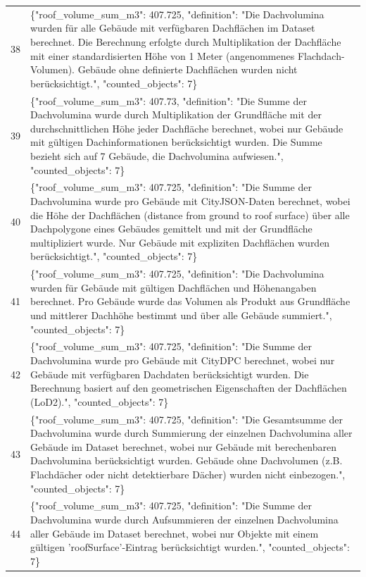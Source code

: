 \documentclass[a4paper,11pt]{article}
\begin{document}
\begin{table}[ht]
\begin{tabular}{r p{12cm}}
38 & \{"roof\_volume\_sum\_m3": 407.725, "definition": "Die Dachvolumina wurden für alle Gebäude mit verfügbaren Dachflächen im Dataset berechnet. Die Berechnung erfolgte durch Multiplikation der Dachfläche mit einer standardisierten Höhe von 1 Meter (angenommenes Flachdach-Volumen). Gebäude ohne definierte Dachflächen wurden nicht berücksichtigt.", "counted\_objects": 7\} \\
39 & \{"roof\_volume\_sum\_m3": 407.73, "definition": "Die Summe der Dachvolumina wurde durch Multiplikation der Grundfläche mit der durchschnittlichen Höhe jeder Dachfläche berechnet, wobei nur Gebäude mit gültigen Dachinformationen berücksichtigt wurden. Die Summe bezieht sich auf 7 Gebäude, die Dachvolumina aufwiesen.", "counted\_objects": 7\} \\
40 & \{"roof\_volume\_sum\_m3": 407.725, "definition": "Die Summe der Dachvolumina wurde pro Gebäude mit CityJSON-Daten berechnet, wobei die Höhe der Dachflächen (distance from ground to roof surface) über alle Dachpolygone eines Gebäudes gemittelt und mit der Grundfläche multipliziert wurde. Nur Gebäude mit expliziten Dachflächen wurden berücksichtigt.", "counted\_objects": 7\} \\
41 & \{"roof\_volume\_sum\_m3": 407.725, "definition": "Die Dachvolumina wurden für Gebäude mit gültigen Dachflächen und Höhenangaben berechnet. Pro Gebäude wurde das Volumen als Produkt aus Grundfläche und mittlerer Dachhöhe bestimmt und über alle Gebäude summiert.", "counted\_objects": 7\} \\
42 & \{"roof\_volume\_sum\_m3": 407.725, "definition": "Die Summe der Dachvolumina wurde pro Gebäude mit CityDPC berechnet, wobei nur Gebäude mit verfügbaren Dachdaten berücksichtigt wurden. Die Berechnung basiert auf den geometrischen Eigenschaften der Dachflächen (LoD2).", "counted\_objects": 7\} \\
43 & \{"roof\_volume\_sum\_m3": 407.725, "definition": "Die Gesamtsumme der Dachvolumina wurde durch Summierung der einzelnen Dachvolumina aller Gebäude im Dataset berechnet, wobei nur Gebäude mit berechenbaren Dachvolumina berücksichtigt wurden. Gebäude ohne Dachvolumen (z.B. Flachdächer oder nicht detektierbare Dächer) wurden nicht einbezogen.", "counted\_objects": 7\} \\
44 & \{"roof\_volume\_sum\_m3": 407.725, "definition": "Die Summe der Dachvolumina wurde durch Aufsummieren der einzelnen Dachvolumina aller Gebäude im Dataset berechnet, wobei nur Objekte mit einem gültigen 'roofSurface'-Eintrag berücksichtigt wurden.", "counted\_objects": 7\} \\

\end{tabular}
\end{table}
\end{document}
